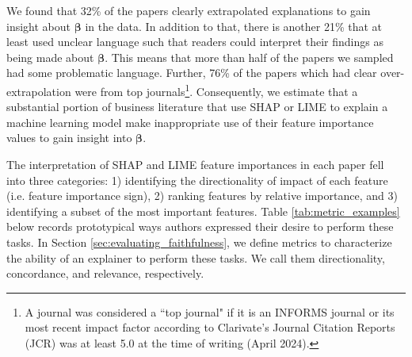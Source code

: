\documentclass[mnsc,blindrev]{informs3}
\begin{document}
        We found that 32\% of the papers clearly extrapolated explanations to gain insight about $\boldsymbol{\beta}$ in the data. In addition to that, there is another 21\% that at least used unclear language such that readers could interpret their findings as being made about $\boldsymbol{\beta}$. This means that more than half of the papers we sampled had some problematic language. Further, 76\% of the papers which had clear over-extrapolation were from top journals\footnote{A journal was considered a ``top journal" if it is an INFORMS journal or its most recent impact factor according to Clarivate's Journal Citation Reports (JCR) was at least 5.0 at the time of writing (April 2024).}.
        Consequently, we estimate that a substantial portion of business literature that use SHAP or LIME to explain a machine learning model make inappropriate use of their feature importance values to gain insight into $\boldsymbol{\beta}$.

        The interpretation of SHAP and LIME feature importances in each paper fell into three categories: 1) identifying the directionality of impact of each feature (i.e. feature importance sign), 2) ranking features by relative importance, and 3) identifying a subset of the most important features. Table \ref{tab:metric_examples} below records prototypical ways authors expressed their desire to perform these tasks. In Section \ref{sec:evaluating_faithfulness}, we define metrics to characterize the ability of an explainer to perform these tasks. We call them directionality, concordance, and relevance, respectively. 
\end{document}
